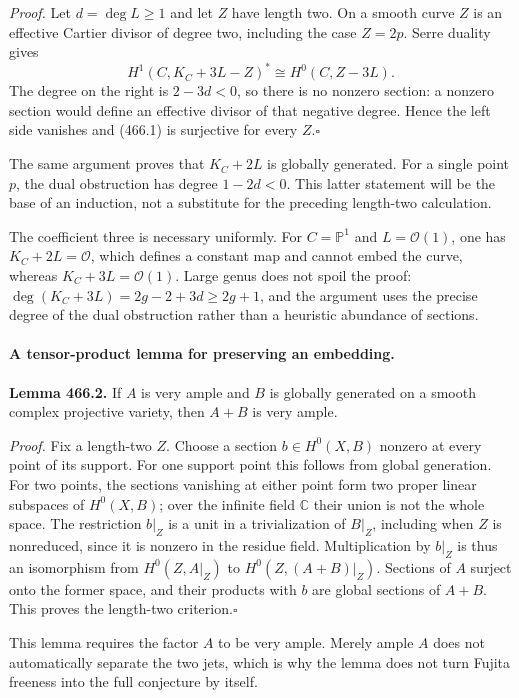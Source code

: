 \documentclass[11pt]{article}
\begin{document}
\emph{Proof.}
Let $d=\deg L\geq1$ and let $Z$ have length two. On a smooth curve
$Z$ is an effective Cartier divisor of degree two, including the case
$Z=2p$. Serre duality gives
\[
 H^1(C,K_C+3L-Z)^*\cong H^0(C,Z-3L).
\]
The degree on the right is $2-3d<0$, so there is no nonzero section:
a nonzero section would define an effective divisor of that negative
degree. Hence the left side vanishes and (466.1) is surjective for
every $Z$.\hfill$\square$

The same argument proves that $K_C+2L$ is globally generated. For a
single point $p$, the dual obstruction has degree $1-2d<0$.
This latter statement will be the base of an induction, not a substitute
for the preceding length-two calculation.

The coefficient three is necessary uniformly. For $C=\mathbb P^1$
and $L=\mathcal O(1)$, one has $K_C+2L=\mathcal O$, which defines
a constant map and cannot embed the curve, whereas
$K_C+3L=\mathcal O(1)$. Large genus does not spoil the proof:
$\deg(K_C+3L)=2g-2+3d\geq2g+1$, and the argument uses the precise
degree of the dual obstruction rather than a heuristic abundance of sections.

\paragraph{A tensor-product lemma for preserving an embedding.}
\textbf{Lemma 466.2.} If $A$ is very ample and $B$ is globally generated
on a smooth complex projective variety, then $A+B$ is very ample.

\emph{Proof.}
Fix a length-two $Z$. Choose a section $b\in H^0(X,B)$ nonzero at
every point of its support. For one support point this follows from
global generation. For two points, the sections vanishing at either
point form two proper linear subspaces of $H^0(X,B)$; over the infinite
field $\mathbb C$ their union is not the whole space.
The restriction $b|_Z$ is a unit in a trivialization of $B|_Z$, including
when $Z$ is nonreduced, since it is nonzero in the residue field.
Multiplication by $b|_Z$ is thus an isomorphism from $H^0(Z,A|_Z)$
to $H^0(Z,(A+B)|_Z)$. Sections of $A$ surject onto the former space,
and their products with $b$ are global sections of $A+B$. This proves
the length-two criterion.\hfill$\square$

This lemma requires the factor $A$ to be very ample. Merely ample
$A$ does not automatically separate the two jets, which is why the
lemma does not turn Fujita freeness into the full conjecture by itself.
\end{document}
